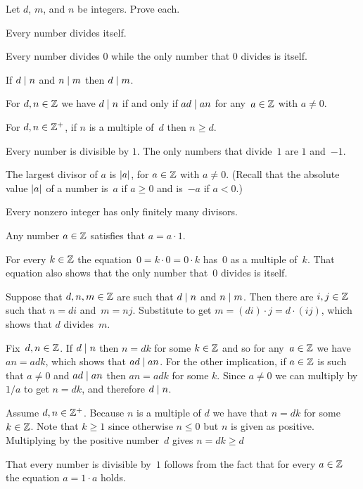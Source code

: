 \documentclass{ibl}
\begin{document}
\begin{ex} \label{ex:DivisibilityProperties}
Let $d$, $m$, and $n$ be integers.
Prove each.
\begin{exes}
\item {} Every number divides itself.
\item Every number divides $0$ while
  the only number that $0$ divides is itself.
\item {} If $d\mid n$ and $n\mid m$ 
   then $d\mid m$.
\item {} 
  For $d,n\in\mathbb{Z}$ we have $d\mid n$ if and only if 
  $ad\mid an$ for any~$a\in\mathbb{Z}$ with $a\neq 0$.
\item {} 
  For $d,n\in\mathbb{Z}^+$, if $n$ is a multiple of~$d$ then $n\geq d$.
\item Every number is divisible by $1$.
  The only numbers that divide~$1$ are $1$ and~$-1$.
\item The largest divisor of $a$ is $\lvert a\rvert$, for $a\in\mathbb{Z}$ with $a\neq 0$.
  (Recall that the absolute value  $\lvert a\rvert$ of a number is~$a$ 
  if $a\geq 0$ and is~$-a$ if $a<0$.)
\item Every nonzero integer has only finitely many divisors.
\end{exes}
\begin{ans}
\begin{exes}
\item Any number $a\in\mathbb{Z}$ satisfies that $a=a\cdot 1$.
\item For every $k\in\mathbb{Z}$ the equation~$0=k\cdot 0=0\cdot k$ has~$0$ 
  as a multiple of~$k$.
  That equation also shows that the only number that~$0$ divides is itself. 
\item Suppose that $d, n, m\in\mathbb{Z}$ are such that $d\mid n$ and
  $n\mid m$.
  Then there are $i,j\in\mathbb{Z}$ such that $n=di$ and~$m=nj$.
  Substitute to get $m=(di)\cdot j=d\cdot(ij)$, which shows that
  $d$ divides~$m$.
\item Fix~$d,n\in\mathbb{Z}$.
  If $d\mid n$ then $n=dk$ for some $k\in\mathbb{Z}$ and so for any~$a\in\mathbb{Z}$
  we have $an=adk$, which shows that $ad\mid an$.
  For the other implication, if $a\in\mathbb{Z}$ is such that $a\neq 0$ and
  $ad\mid an$ then $an=adk$ for some  $k$.
  Since $a\neq 0$ we can multiply by $1/a$ to get $n=dk$, and therefore
  $d\mid n$.
\item Assume $d,n\in\mathbb{Z}^+$.
  Because $n$ is a multiple of $d$ we have that $n=dk$ for some $k\in\mathbb{Z}$.
  Note that $k\geq 1$ since otherwise $n\leq 0$ but $n$ is given as positive.  
  Multiplying by the positive number~$d$ gives $n=dk\geq d$ 
\item That every number is divisible by~$1$ follows from the fact that
   for every $a\in\mathbb{Z}$ the equation $a=1\cdot a$ holds.


\end{exes}
\end{ans}
\end{ex}
\end{document}

